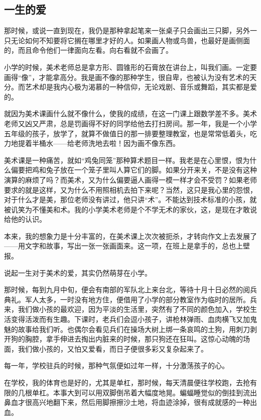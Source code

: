 \subsection{一生的爱}



\par 那时候，或说一直到现在，我仍是那种拿起笔来一张桌子只会画出三只脚，另外一只无论如何不知要将它搁在哪里才好的人。如果画人物或鸟兽，也最好是画侧面的，而且命令他们一律面向左看。向右看就不会画了。
\par 小学的时候，美术老师总是拿方形、圆锥形的石膏放在讲台上，叫我们画。一定要画得“像”，才能拿高分。我是画不像的那种学生，很自卑，也被认为没有艺术的天分。而艺术却是我内心极为渴慕的一种信仰，无论戏剧、音乐或舞蹈，其实都是爱的。
\par 就因为美术课画什么就不像什么，使我的成绩，在这一门课上跟数学差不多。美术老师又凶又严肃，总是罚画得不好的同学给他去打扫房间。那一年，我是一个小学五年级的孩子，放学了，就算不做值日的那一排要整理教室，也是常常低着头，吃力地提着半桶水——给老师洗地去啦！因为画不像东西。
\par 美术课是一种痛苦，就如“鸡兔同笼”那种算术题目一样。我老是在心里恨，恨为什么偏要把鸡和兔子放在一个笼子里叫人算它们的脚。如果分开来关，不是没有这种演算的麻烦了吗？而美术，又为什么偏要逼人画得一模一样才会不受罚？如果老师要求的就是这样，又为什么不用照相机去拍下来呢？当然，这只是我心里的怨恨，对于什么才是美，那位老师没有讲过，他只讲“术”。不能达到技术标准的小孩，就被讥笑为不懂美和术。我的小学美术老师是个不学无术的家伙，这，是现在才敢说给他的认识。
\par 本来，我的想象力是十分丰富的，在美术课上次次被扼杀，才转向作文上去发展了——用文字和故事，写出一张一张画面来。这一项，在班上是拿手的，总也上壁报。
\par 说起一生对于美术的爱，其实仍然萌芽在小学。
\par 那时候，每到九月中旬，便会有南部的军队北上来台北，等待十月十日必然的阅兵典礼。军人太多，一时没有地方住，便借用了小学的部分教室作为临时的居所。兵来，我们做小孩的最欢迎，因为平淡的生活里，突然有了不同的颜色加入，学校生活变得活泼而有生趣。下课时，老兵们会逗小孩子，讲枪林弹雨、血肉横飞又加鬼魅的故事给我们听。也偶尔会看见兵们在操场大树上绑一条哀鸣的土狗，用刺刀剥开狗的胸腔，拿手伸进去掏出内脏来的时候，那只狗还在狂叫。这惊心动魄的场面，我们做小孩的，又怕又爱看，而日子便很多彩又复杂起来了。
\par 每一年，学校驻兵的时候，那种气氛便如过年一样，十分激荡孩子的心。
\par 在学校，我的体育也是好的，尤其是单杠，那时候，每天清晨便往学校跑，去抢有限的几根单杠。本事大到可以用双脚倒吊着大幅度地晃。蝙蝠睡觉似的倒挂到流出鼻血才很高兴地翻下来，然后用脚擦擦沙土地，将血迹涂掉，很有成就感的一种出血。

